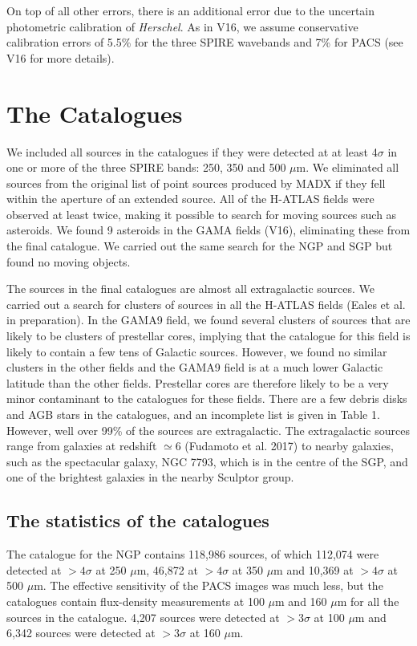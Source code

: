 \documentclass[useAMS,usenatbib]{mnras}
\begin{document}
On top of all other errors, there is an additional error due to the
uncertain photometric calibration of {\it Herschel}. As in V16, we assume
conservative calibration errors of 5.5\% for the three SPIRE wavebands
and 7\% for PACS (see V16 for more details).

\section{The Catalogues}

We included all sources in the catalogues if they were detected at at
least 4$\sigma$ in one or more of the three SPIRE bands: 250, 350 and
500 $\mu$m.  We eliminated all sources from the original list of point
sources produced by MADX if they fell within the aperture of an
extended source. All of the H-ATLAS fields were observed at least
twice, making it possible to search for moving sources such as
asteroids. We found 9 asteroids in the GAMA fields (V16), eliminating
these from the final catalogue. We carried out the same search for the
NGP and SGP but found no moving objects.


The sources in the final catalogues are almost all extragalactic
sources. We carried out a search for clusters of sources in all the
H-ATLAS fields (Eales et al. in preparation).  In the GAMA9 field, we
found several clusters of sources that are likely to be clusters of
prestellar cores, implying that the catalogue for this field is likely
to contain a few tens of Galactic sources.  However, we found no
similar clusters in the other fields and the GAMA9 field is at a much
lower Galactic latitude than the other fields. Prestellar cores are
therefore likely to be a very minor contaminant to the catalogues for
these fields. There are a few debris disks and AGB stars in the
catalogues, and an incomplete list is given in Table 1.  However, well
over 99\% of the sources are extragalactic. The extragalactic sources
range from galaxies at redshift $\simeq$6 (Fudamoto et al. 2017) to
nearby galaxies, such as the spectacular galaxy, NGC 7793, which is in
the centre of the SGP, and one of the brightest galaxies in the nearby
Sculptor group.

\subsection{The statistics of the catalogues}

The catalogue for the NGP contains 118,986 sources, of which 112,074
were detected at $>4\sigma$ at 250 $\mu$m, 46,872 at $>4\sigma$ at 350
$\mu$m and 10,369 at $>4\sigma$ at 500 $\mu$m. The effective
sensitivity of the PACS images was much less, but the catalogues
contain flux-density measurements at 100 $\mu$m and 160 $\mu$m for all
the sources in the catalogue. 4,207 sources were detected at
$>3\sigma$ at 100 $\mu$m and 6,342 sources were detected at $>3\sigma$
at 160 $\mu$m.
\end{document}
